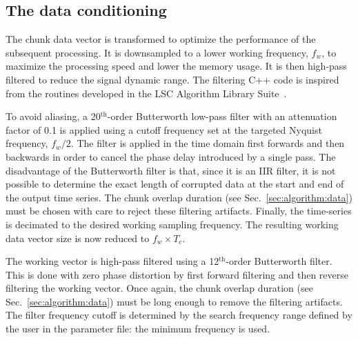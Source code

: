 \subsection{The data conditioning} \label{sec:algorithm:conditioning}
The chunk data vector is transformed to optimize the performance of the subsequent processing. It is downsampled to a lower working frequency, $f_w$, to maximize the processing speed and lower the memory usage. It is then high-pass filtered to reduce the signal dynamic range. The filtering C++ code is inspired from the routines developed in the LSC Algorithm Library Suite~\cite{LALSUITE}.

To avoid aliasing, a 20$^{\mathrm{th}}$-order Butterworth low-pass filter with an attenuation factor of 0.1 is applied using a cutoff frequency set at the targeted Nyquist frequency, $f_w/2$. The filter is applied in the time domain first forwards and then backwards in order to cancel the phase delay introduced by a single pass. The disadvantage of the Butterworth filter is that, since it is an IIR filter, it is not possible to determine the exact length of corrupted data at the start and end of the output time series. The chunk overlap duration (see Sec.~\ref{sec:algorithm:data}) must be chosen with care to reject these filtering artifacts. Finally, the time-series is decimated to the desired working sampling frequency. The resulting working data vector size is now reduced to $f_w \times T_c$.

The working vector is high-pass filtered using a 12$^{\mathrm{th}}$-order Butterworth filter. This is done with zero phase distortion by first forward filtering and then reverse filtering the working vector. Once again, the chunk overlap duration (see Sec.~\ref{sec:algorithm:data}) must be long enough to remove the filtering artifacts. The filter frequency cutoff is determined by the search frequency range defined by the user in the parameter file: the minimum frequency is used.

